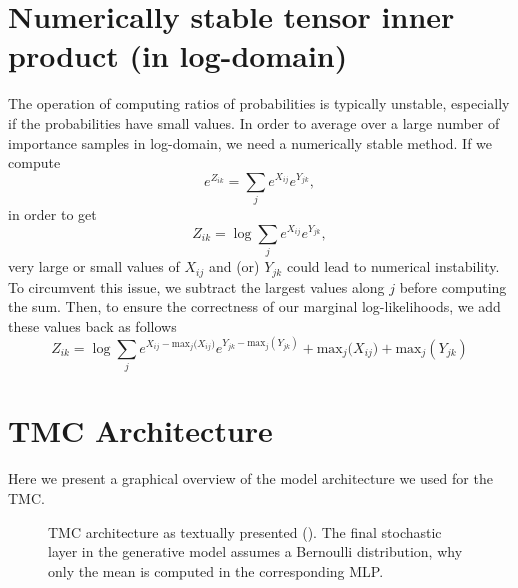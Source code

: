 \begin{appendices}

\section{Numerically stable tensor inner product (in log-domain)}


\label{sec:appendix_tmul}
The operation of computing ratios of probabilities is typically unstable, especially if the probabilities have small values. In order to average over a large number of importance samples in log-domain, we need a numerically stable method. If we compute    
\begin{equation*}
    e^{Z_{ik}} = \sum_j e^{X_{ij}}e^{Y_{jk}},
\end{equation*}
in order to get
\begin{equation*}
    Z_{ik} = \log \sum_j e^{X_{ij}}e^{Y_{jk}},
\end{equation*}
very large or small values of $X_{ij}$ and (or) $Y_{jk}$ could lead to numerical instability. To circumvent this issue, we subtract the largest values along $j$ before computing the sum. Then, to ensure the correctness of our marginal log-likelihoods, we add these values back as follows
\begin{equation*}
    Z_{ik} = \log \sum_j e^{X_{ij} - \text{max}_j({X_{ij})}}e^{Y_{jk} - \text{max}_j(Y_{jk})} + \text{max}_j({X_{ij}) + \text{max}_j}(Y_{jk}) 
\end{equation*}

\section{TMC Architecture}
\label{sec:appendix_tmc_arch}
Here we present a graphical overview of the model architecture we used for the TMC.
\begin{figure}[h]
\begin{center}
%
\end{center}
\caption{TMC architecture as textually presented (\cite{tmc}). The final stochastic layer in the generative model assumes a Bernoulli distribution, why only the mean is computed in the corresponding MLP.}
\label{fig:tmc_layout}
\end{figure}



\end{appendices}
